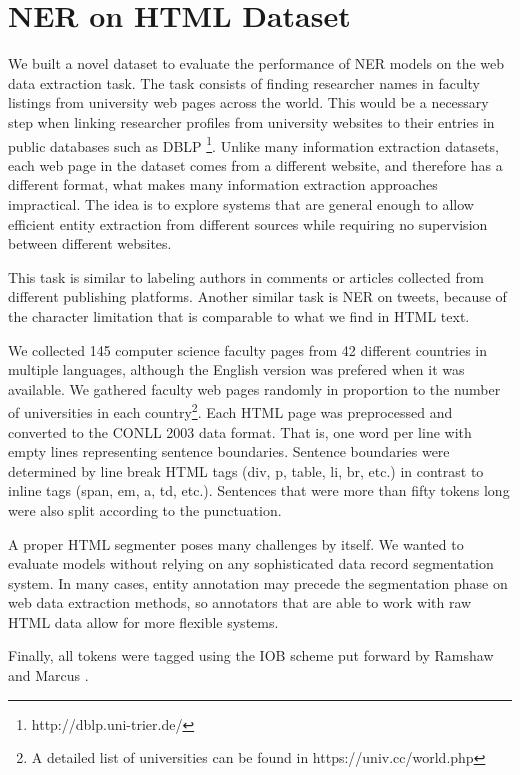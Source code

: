 \documentclass{nle}
\begin{document}
\section{NER on HTML Dataset}
\label{sec:ner_dataset}

We built a novel dataset to evaluate the performance of NER models
on the web data extraction task. The task consists of finding researcher
names in faculty listings from university web pages across the world. This would be a
necessary step when linking researcher profiles from university websites to their entries
in public databases such as DBLP \footnote{http://dblp.uni-trier.de/}. Unlike many
information extraction datasets, each web page in the dataset comes from a different 
website, and therefore has a different format, what makes many information
extraction approaches impractical. The idea is to explore systems that are general 
enough to allow efficient entity extraction from different sources while requiring
no supervision between different websites. 

This task is similar to labeling authors in comments or articles collected
from different publishing platforms. Another similar task is NER on tweets,
because of the character limitation that is comparable to what we find in 
HTML text.

We collected 145 computer science faculty pages from 42 different countries in
multiple languages, although the English version was prefered when it was available.
We gathered faculty web pages randomly in proportion to
the number of universities in each country\footnote{A detailed list of universities can
be found in https://univ.cc/world.php}. Each HTML page was preprocessed and converted
to the CONLL 2003 data format. That is, one word per line with empty lines representing
sentence boundaries. Sentence boundaries were determined by line break HTML tags
(div, p, table, li, br, etc.) in contrast to inline tags (span, em, a, td, etc.). 
Sentences that were more than fifty tokens long were also split according to the
punctuation.

A proper HTML segmenter poses many challenges by itself. We wanted to evaluate 
models without relying on any sophisticated data record segmentation system.
In many cases, entity annotation may precede the segmentation
phase on web data extraction methods, so annotators that are able to work 
with raw HTML data allow for more flexible systems. 

Finally, all tokens were tagged using the IOB scheme put forward by
Ramshaw and Marcus \cite{Ramshaw1999}. 
\end{document}
